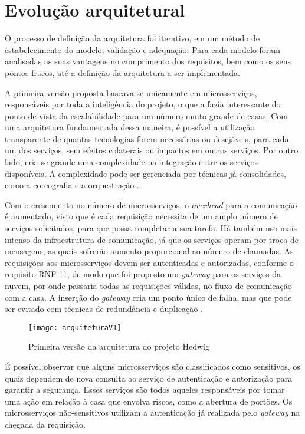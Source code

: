 \section{Evolução arquitetural}
O processo de definição da arquitetura foi iterativo, em um método de estabelecimento do modelo, validação e adequação. Para cada modelo foram analisadas as suas vantagens no cumprimento dos requisitos, bem como os seus pontos fracos, até a definição da arquitetura a ser implementada.

A primeira versão proposta baseava-se unicamente em microsserviços, responsáveis por toda a inteligência do projeto, o que a fazia interessante do ponto de vista da escalabilidade para um número muito grande de casas. Com uma arquitetura fundamentada dessa maneira, é possível a utilização transparente de quantas tecnologias forem necessárias ou desejáveis, para cada um dos serviços, sem efeitos colaterais ou impactos em outros serviços. Por outro lado, cria-se grande uma complexidade na integração entre os serviços disponíveis. A complexidade pode ser gerenciada por técnicas já consolidades, como a coreografia e a orquestração \cite{lewis}.

Com o crescimento no número de microsserviços, o \emph{overhead} para a comunicação é aumentado, visto que é cada requisição necessita de um amplo número de serviços solicitados, para que possa completar a sua tarefa. Há também uso mais intenso da infraestrutura de comunicação, já que os serviços operam por troca de mensagens, as quais sofrerão aumento proporcional ao número de chamadas. As requisições aos microsserviços devem ser autenticadas e autorizadas, conforme o requisito RNF-11, de modo que foi proposto um \emph{gateway} para os serviços da nuvem, por onde passaria todas as requisições válidas, no fluxo de comunicação com a casa. A inserção do \emph{gateway} cria um ponto único de falha, mas que pode ser evitado com técnicas de redundância e duplicação \cite{oracleSPOF}.

\begin{figure}[H]
	\centering
	\caption{Primeira versão da arquitetura do projeto Hedwig}
  \texttt{[image: arquiteturaV1]}
\label{fig:arquiteturaV1}
\end{figure}

É possível observar que alguns microsserviços são classificados como sensitivos, os quais dependem de nova consulta ao serviço de autenticação e autorização para garantir a segurança. Esses serviços são todos aqueles responsáveis por tomar uma ação em relação à casa que envolva riscos, como a abertura de portões. Os microsserviços não-sensitivos utilizam a autenticação já realizada pelo \textit{gateway} na chegada da requisição.

